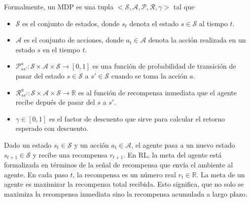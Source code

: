 Formalmente, un MDP es una tupla $< \mathcal{S}, \mathcal{A}, \mathcal{P}, \mathcal{R}, \gamma>$ tal que

\begin{itemize}
    \item $\mathcal{S}$ es el conjunto de estados, donde $s_t$ denota el estado $s\in \mathcal{S}$ al tiempo $t$.
    \item $\mathcal{A}$ es el conjunto de acciones, donde $a_t \in \mathcal{A}$
    denota la acción realizada en un estado $s$ en el tiempo $t$.
    \item $\mathcal{P}_{ss'}^{a}: \mathcal{S}\times \mathcal{A} \times \mathcal{S} \rightarrow [0, 1]$ es una función de probabilidad de transición de pasar del estado $s \in \mathcal{S}$ a $s' \in \mathcal{S}$ cuando se toma la acción $a$.%
    \item $\mathcal{R}_{ss'}^{a}: \mathcal{S} \times \mathcal{A} \times \mathcal{S} \rightarrow \mathbb{R}$ es al función de recompensa inmediata que el agente recibe depués de pasar del $s$ a $s'$.
    \item $\gamma \in [0,1]$ es el factor de descuento que sirve para
    calcular el retorno esperado con descuento.
\end{itemize}





Dado un estado $s_t \in \mathcal{S}$ y un
acción $a_t\in \mathcal{A}$, el agente pasa a un nuevo
estado $s_{t+1} \in \mathcal{S}$ y recibe una recompensa
$r_{t+1}$.
En RL, la meta del agente está formalizada
en términos de la señal de recompensa que
envía el ambiente al agente. En cada paso $t$, la recompensa es un número real $r_t \in \mathbb{R}$. La meta de un agente
es maximizar la recompensa total recibida.
Esto significa, que no solo se maximiza la recompensa inmediata sino la recompensa acumulada a largo plazo.

